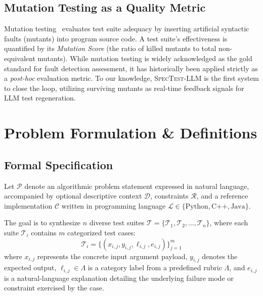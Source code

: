 \documentclass[conference]{IEEEtran}
\begin{document}
\subsection{Mutation Testing as a Quality Metric}
Mutation testing~\cite{jia2011mutation} evaluates test suite adequacy by inserting artificial syntactic faults (mutants) into program source code. A test suite's effectiveness is quantified by its \emph{Mutation Score} (the ratio of killed mutants to total non-equivalent mutants). While mutation testing is widely acknowledged as the gold standard for fault detection assessment, it has historically been applied strictly as a \emph{post-hoc} evaluation metric. To our knowledge, \textsc{SpecTest-LLM} is the first system to close the loop, utilizing surviving mutants as real-time feedback signals for LLM test regeneration.

\section{Problem Formulation \& Definitions}
\label{sec:formulation}

\subsection{Formal Specification}
Let $\mathcal{P}$ denote an algorithmic problem statement expressed in natural language, accompanied by optional descriptive context $\mathcal{D}$, constraints $\mathcal{R}$, and a reference implementation $\mathcal{C}$ written in programming language $\mathcal{L} \in \{\text{Python}, \text{C++}, \text{Java}\}$.

The goal is to synthesize $n$ diverse test suites $\mathcal{T} = \{\mathcal{T}_1, \mathcal{T}_2, \dots, \mathcal{T}_n\}$, where each suite $\mathcal{T}_i$ contains $m$ categorized test cases:
\begin{equation}
    \mathcal{T}_i = \{(x_{i,j}, y_{i,j}, \ell_{i,j}, e_{i,j})\}_{j=1}^{m}
\end{equation}
where $x_{i,j}$ represents the concrete input argument payload, $y_{i,j}$ denotes the expected output, $\ell_{i,j} \in \Lambda$ is a category label from a predefined rubric $\Lambda$, and $e_{i,j}$ is a natural-language explanation detailing the underlying failure mode or constraint exercised by the case.
\end{document}
